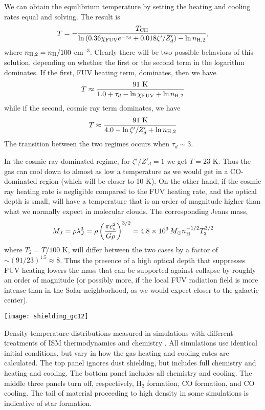 We can obtain the equilibrium temperature by setting the heating and cooling rates equal and solving. The result is
\begin{equation}
T = -\frac{T_{\rm CII}}{\ln \left( 0.36 \chi_{\rm FUV} e^{-\tau_d} + 0.018 \zeta'/Z'_d\right) - \ln n_{\rm H,2}},
\end{equation}
where $n_{\rm H,2} = n_{\rm H}/100$ cm$^{-3}$. Clearly there will be two possible behaviors of this solution, depending on whether the first or the second term in the logarithm dominates. If the first, FUV heating term, dominates, then we have
\begin{equation}
T \approx \frac{91\mbox{ K}}{1.0 + \tau_d - \ln \chi_{\rm FUV} + \ln n_{\rm H,2}}
\end{equation}
while if the second, cosmic ray term dominates, we have
\begin{equation}
T \approx \frac{91\mbox{ K}}{4.0 - \ln \zeta'/Z'_d + \ln n_{\rm H,2}}
\end{equation}
The transition between the two regimes occurs when $\tau_d \sim 3$.

In the cosmic ray-dominated regime, for $\zeta'/Z'_d = 1$ we get $T = 23$ K. Thus the gas can cool down to almost as low a temperature as we would get in a CO-dominated region (which will be closer to 10 K). On the other hand, if the cosmic ray heating rate is negligible compared to the FUV heating rate, and the optical depth is small, will have a temperature that is an order of magnitude higher than what we normally expect in molecular clouds. The corresponding Jeans mass,
\begin{equation}
M_J = \rho \lambda_J^3 = \rho \left(\frac{\pi c_s^2}{G \rho}\right)^{3/2} = 4.8\times 10^3\,M_\odot n_{\rm H}^{-1/2} T_2^{3/2}
\end{equation}
where $T_2 = T/100$ K, will differ between the two cases by a factor of $\sim (91/23)^{1.5} \approx 8$. Thus the presence of a high optical depth that suppresses FUV heating lowers the mass that can be supported against collapse by roughly an order of magnitude (or possibly more, if the local FUV radiation field is more intense than in the Solar neighborhood, as we would expect closer to the galactic center).

\begin{marginfigure}
\texttt{[image: shielding\_gc12]}
\caption[Density-temperature distribution for different cooling models]{
\label{fig:shielding_gc12}
Density-temperature distributions measured in simulations with different treatments of ISM thermodynamics and chemistry \citet{glover12a}. All simulations use identical initial conditions, but vary in how the gas heating and cooling rates are calculated. The top panel ignores dust shielding, but includes full chemistry and heating and cooling. The bottom panel includes all chemistry and cooling. The middle three panels turn off, respectively, H$_2$ formation, CO formation, and CO cooling. The tail of material proceeding to high density in some simulations is indicative of star formation.
}
\end{marginfigure}

